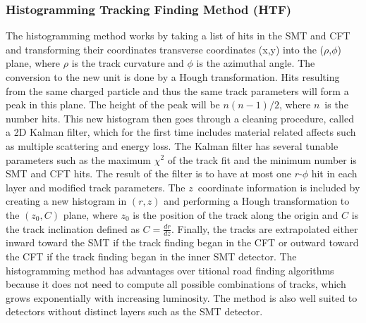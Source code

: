 \subsubsection{Histogramming Tracking Finding Method (HTF)}
\label{htf}
The histogramming method works by taking a list of hits in the SMT and CFT and transforming their coordinates transverse coordinates (x,y) into the ($\rho$,$\phi$) plane, where $\rho$ is the track curvature and $\phi$ is the azimuthal angle. The conversion to the new unit is done by a Hough transformation. Hits resulting from the same charged particle and thus the same track parameters will form a peak in this plane. The height of the peak will be $n(n-1)/2$, where $n$~is the number hits. This new histogram then goes through a cleaning procedure, called a 2D Kalman filter, which for the first time includes material related affects such as multiple scattering and energy loss. The Kalman filter has several tunable parameters such as the maximum $\chi^{2}$ of the track fit and the minimum number is SMT and CFT hits. The result of the filter is to have at most one $r$-$\phi$ hit in each layer and modified track parameters. The $z$~coordinate information is included by creating a new histogram in $(r,z)$ and performing a Hough transformation to the $(z_{0},C)$ plane, where $z_{0}$ is the position of the track along the origin and $C$ is the track inclination defined as $C = \frac{dr}{dz}$. Finally, the tracks are extrapolated either inward toward the SMT if the track finding began in the CFT or outward toward the CFT if the track finding began in the inner SMT detector. The histogramming method has advantages over titional road finding algorithms because it does not need to compute all possible combinations of tracks, which grows exponentially with increasing luminosity. The method is also well suited to detectors without distinct layers such as the SMT detector.


